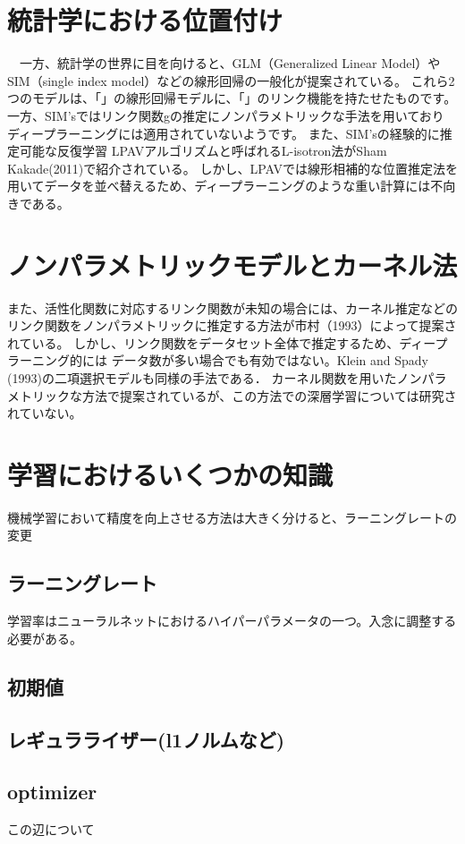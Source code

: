 \section{統計学における位置付け}
　一方、統計学の世界に目を向けると、GLM（Generalized Linear Model）やSIM（single index model）などの線形回帰の一般化が提案されている。
これら2つのモデルは、「」の線形回帰モデルに、「」のリンク機能を持たせたものです。 
 一方、SIM'sではリンク関数gの推定にノンパラメトリックな手法を用いており ディープラーニングには適用されていないようです。
 また、SIM'sの経験的に推定可能な反復学習 LPAVアルゴリズムと呼ばれるL-isotron法がSham Kakade(2011)で紹介されている。 
 しかし、LPAVでは線形相補的な位置推定法を用いてデータを並べ替えるため、ディープラーニングのような重い計算には不向きである。 


\section{ノンパラメトリックモデルとカーネル法}

 また、活性化関数に対応するリンク関数が未知の場合には、カーネル推定などのリンク関数をノンパラメトリックに推定する方法が市村（1993）によって提案されている。
 しかし、リンク関数をデータセット全体で推定するため、ディープラーニング的には データ数が多い場合でも有効ではない。Klein and Spady (1993)の二項選択モデルも同様の手法である．
 カーネル関数を用いたノンパラメトリックな方法で提案されているが、この方法での深層学習については研究されていない。




\section{学習におけるいくつかの知識}
機械学習において精度を向上させる方法は大きく分けると、ラーニングレートの変更
\subsection{ラーニングレート}
学習率はニューラルネットにおけるハイパーパラメータの一つ。入念に調整する必要がある。
\subsection{初期値}
\subsection{レギュラライザー(l1ノルムなど)}
\subsection{optimizer}
この辺について
